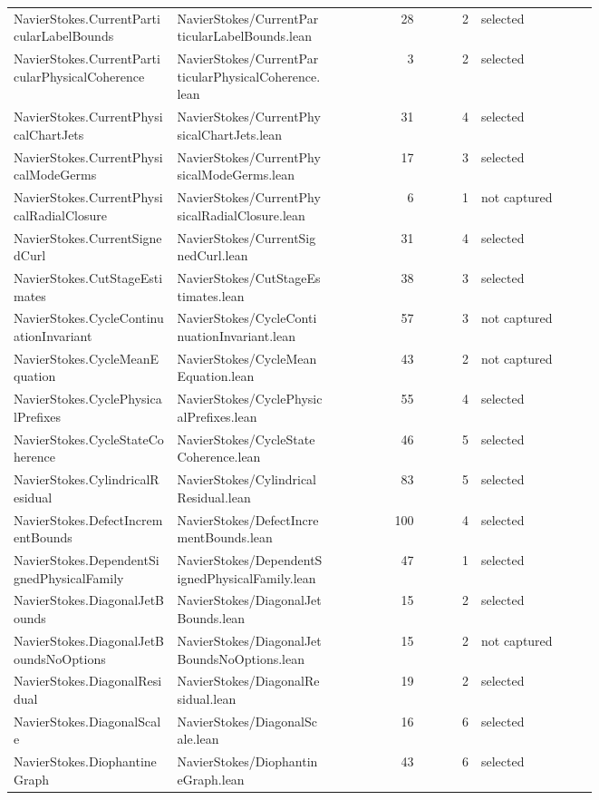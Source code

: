 \documentclass[10pt]{article}
\begin{document}
\begin{longtable}{p{0.28\linewidth}p{0.27\linewidth}r r p{0.20\linewidth}}
NavierStokes.CurrentParticularLabelBounds & NavierStokes/CurrentParticularLabelBounds.lean & 28 & 2 & selected\\
NavierStokes.CurrentParticularPhysicalCoherence & NavierStokes/CurrentParticularPhysicalCoherence.lean & 3 & 2 & selected\\
NavierStokes.CurrentPhysicalChartJets & NavierStokes/CurrentPhysicalChartJets.lean & 31 & 4 & selected\\
NavierStokes.CurrentPhysicalModeGerms & NavierStokes/CurrentPhysicalModeGerms.lean & 17 & 3 & selected\\
NavierStokes.CurrentPhysicalRadialClosure & NavierStokes/CurrentPhysicalRadialClosure.lean & 6 & 1 & not captured\\
NavierStokes.CurrentSignedCurl & NavierStokes/CurrentSignedCurl.lean & 31 & 4 & selected\\
NavierStokes.CutStageEstimates & NavierStokes/CutStageEstimates.lean & 38 & 3 & selected\\
NavierStokes.CycleContinuationInvariant & NavierStokes/CycleContinuationInvariant.lean & 57 & 3 & not captured\\
NavierStokes.CycleMeanEquation & NavierStokes/CycleMeanEquation.lean & 43 & 2 & not captured\\
NavierStokes.CyclePhysicalPrefixes & NavierStokes/CyclePhysicalPrefixes.lean & 55 & 4 & selected\\
NavierStokes.CycleStateCoherence & NavierStokes/CycleStateCoherence.lean & 46 & 5 & selected\\
NavierStokes.CylindricalResidual & NavierStokes/CylindricalResidual.lean & 83 & 5 & selected\\
NavierStokes.DefectIncrementBounds & NavierStokes/DefectIncrementBounds.lean & 100 & 4 & selected\\
NavierStokes.DependentSignedPhysicalFamily & NavierStokes/DependentSignedPhysicalFamily.lean & 47 & 1 & selected\\
NavierStokes.DiagonalJetBounds & NavierStokes/DiagonalJetBounds.lean & 15 & 2 & selected\\
NavierStokes.DiagonalJetBoundsNoOptions & NavierStokes/DiagonalJetBoundsNoOptions.lean & 15 & 2 & not captured\\
NavierStokes.DiagonalResidual & NavierStokes/DiagonalResidual.lean & 19 & 2 & selected\\
NavierStokes.DiagonalScale & NavierStokes/DiagonalScale.lean & 16 & 6 & selected\\
NavierStokes.DiophantineGraph & NavierStokes/DiophantineGraph.lean & 43 & 6 & selected\\

\end{longtable}
\end{document}
